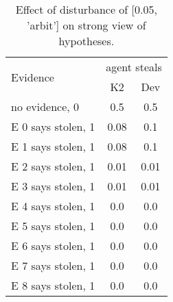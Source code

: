 \begin{table}\begin{tabular}{l|cc}\toprule\multirow{2}{*}{Evidence} & \multicolumn{2}{c}{agent steals}\\& {K2} & {Dev}\\\midrule
no evidence, 0 & 0.5&0.5\\E 0 says stolen, 1 & 0.08&0.1\\E 1 says stolen, 1 & 0.08&0.1\\E 2 says stolen, 1 & 0.01&0.01\\E 3 says stolen, 1 & 0.01&0.01\\E 4 says stolen, 1 & 0.0&0.0\\E 5 says stolen, 1 & 0.0&0.0\\E 6 says stolen, 1 & 0.0&0.0\\E 7 says stolen, 1 & 0.0&0.0\\E 8 says stolen, 1 & 0.0&0.0\\\bottomrule\end{tabular}\caption{Effect of disturbance of [0.05, 'arbit'] on strong view of hypotheses.}\end{table}